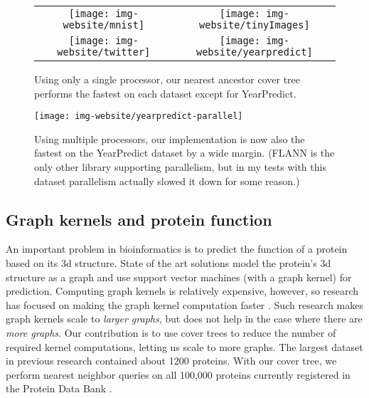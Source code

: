 \documentclass[thesis.tex]{subfiles}
\begin{document}
\begin{figure}
    \begin{tabular}{cc}
    \texttt{[image: img-website/mnist]}
    &
    \texttt{[image: img-website/tinyImages]}
    \\
    \texttt{[image: img-website/twitter]}
    &
    \texttt{[image: img-website/yearpredict]}
    \end{tabular}
    \caption{
Using only a single processor, 
our nearest ancestor cover tree performs the fastest on each dataset except for YearPredict.
    }
    \label{fig:allexp1}
\end{figure}

\begin{figure}
    \centering
    \texttt{[image: img-website/yearpredict-parallel]}
    \caption{
        Using multiple processors, 
        our implementation is now also the fastest on the YearPredict dataset by a wide margin.
        (FLANN is the only other library supporting parallelism, 
        but in my tests with this dataset parallelism actually slowed it down for some reason.)
    }
    \label{fig:allexp2}
\end{figure}


\subsection{Graph kernels and protein function}

An important problem in bioinformatics is to predict the function of a protein based on its 3d structure.
State of the art solutions model the protein's 3d structure as a graph and use support vector machines (with a graph kernel) for prediction.
Computing graph kernels is relatively expensive, however, so research has focused on making the graph kernel computation faster \citep{Vishwanathan2010,Shervashidze2011}.
Such research makes graph kernels scale to \emph{larger graphs}, but does not help in the case where there are \emph{more graphs}.
Our contribution is to use cover trees to reduce the number of required kernel computations, letting us scale to more graphs.
The largest dataset in previous research contained about 1200 proteins.
With our cover tree, we perform nearest neighbor queries on all 100,000 proteins currently registered in the Protein Data Bank \citep{Berman2000}.
\end{document}
